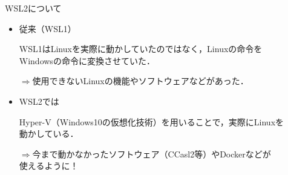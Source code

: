 \documentclass[dvipsnames,usenames,aspectratio=169,12pt]{beamer}
\begin{document}
\begin{frame}{WSL2について}

\begin{itemize}
\item 従来（WSL1）
\vspace{5pt}

WSL1はLinuxを実際に動かしていたのではなく，Linuxの命令を\\\vspace{3pt}
Windowsの命令に\alert{変換}させていた．

\vspace{5pt}
\hspace{10pt}$\Longrightarrow$使用できないLinuxの機能やソフトウェアなどがあった．
\vspace{15pt}

\item WSL2では
\vspace{5pt}

\alert{Hyper-V}（Windows10の仮想化技術）を用いることで，実際にLinuxを\\\vspace{3pt}動かしている．

\vspace{5pt}
\hspace{10pt}$\Longrightarrow$今まで動かなかったソフトウェア（CCasl2等）やDockerなどが
\\\vspace{3pt}\hspace{32.5pt}使えるように！

\end{itemize}

\end{frame}
\end{document}
